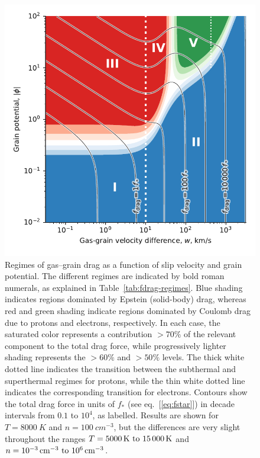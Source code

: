 \begin{figure}
  \includegraphics[width=\linewidth]{figs/test-Fdrag-param-space}
  \caption{Regimes of gas--grain drag as a function of slip velocity
    and grain potential.  The different regimes are indicated by bold
    roman numerals, as explained in
    Table~\ref{tab:fdrag-regimes}. Blue shading indicates regions
    dominated by Epstein (solid-body) drag, whereas red and green
    shading indicate regions dominated by Coulomb drag due to protons
    and electrons, respectively.  In each case, the saturated color
    represents a contribution \(> 70\%\) of the relevant component to
    the total drag force, while progressively lighter shading
    represents the \(> 60\%\) and \(> 50\%\) levels.  The thick white
    dotted line indicates the transition between the subthermal and
    superthermal regimes for protons, while the thin white dotted line
    indicates the corresponding transition for electrons.  Contours
    show the total drag force in units of \(f_*\) (see
    eq.~[\ref{eq:fstar}]) in decade intervals from \(0.1\) to
    \(10^4\), as labelled.  Results are shown for
    \(T = \SI{8000}{K}\) and \(n = \SI{100}{cm^{-3}}\), but the
    differences are very slight throughout the ranges
    \(T = \text{\SIrange{5000}{15000}{K}}\) and
    \(n = \text{\SIrange{e-3}{e6}{cm^{-3}}}\).}
  \label{fig:drag-v-phi-plane}
\end{figure}



